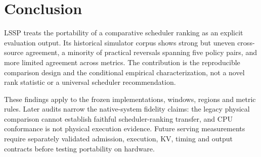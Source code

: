 \section{Conclusion}\label{sec:conclusion}
LSSP treats the portability of a comparative scheduler ranking as an
explicit evaluation output. Its historical simulator corpus shows strong
but uneven cross-source agreement, a minority of practical reversals
spanning five policy pairs, and more limited agreement across metrics.
The contribution is the reproducible comparison design and the
conditional empirical characterization, not a novel rank statistic or a
universal scheduler recommendation.

These findings apply to the frozen implementations, windows, regions and
metric rules. Later audits narrow the native-system fidelity claims:
the legacy physical comparison cannot establish faithful scheduler-ranking
transfer, and CPU conformance is not physical execution evidence. Future
serving measurements require separately validated admission, execution,
KV, timing and output contracts before testing portability on hardware.
